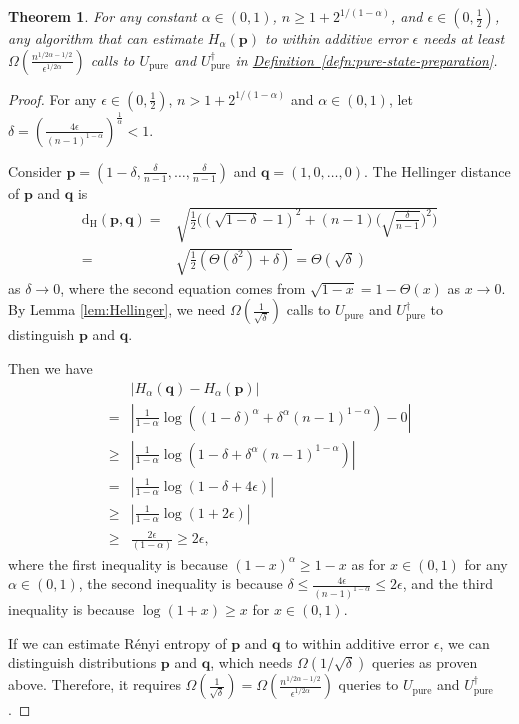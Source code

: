 \documentclass[journal]{IEEEtran}
\newtheorem{theorem}{Theorem}
\newcommand{\defn}[1]{\hyperref[defn:#1]{Definition~\ref*{defn:#1}}}
\begin{document}
\begin{theorem}\label{thm:lower}
    For any constant $\alpha\in (0,1)$, $n \ge 1+2^{1/(1-\alpha)}$, and $\epsilon\in(0,\frac{1}{2})$, any algorithm that can estimate $H_{\alpha}(\mathbf{p})$ to within additive error $\epsilon$ needs at least $\Omega\left(\frac{n^{1/2\alpha-1/2}}{\epsilon^{1/2\alpha}}\right)$ calls to $U_{\mathrm{pure}}$ and $U_{\mathrm{pure}}^{\dagger}$ in \defn{pure-state-preparation}.
\end{theorem}
\begin{proof}
For any $\epsilon\in (0,\frac{1}{2})$, $n > 1+2^{1/(1-\alpha)}$ and $\alpha \in (0,1)$, let $\delta = \left(\frac{4\epsilon}{(n-1)^{1-\alpha}}\right)^{\frac{1}{\alpha}} < 1$. 

Consider $\mathbf{p}=\left(1-\delta, \frac{\delta}{n-1}, \ldots, \frac{\delta}{n-1}\right)$ and $\mathbf{q}=(1,0, \ldots, 0)$. The Hellinger distance of $\mathbf{p}$ and $\mathbf{q}$ is 
\begin{align}
    \mathrm{d_{H}}(\mathbf{p}, \mathbf{q}) = & \sqrt{\frac{1}{2}\biggl((\sqrt{1-\delta}-1)^2+ (n-1)\biggl(\sqrt{\frac{\delta}{n-1}}\biggr)^2 \biggr)} \nonumber \\
    = & \sqrt{\frac{1}{2}\left(\Theta(\delta^2) + \delta\right)}
    = \Theta(\sqrt{\delta})
\end{align}
as $\delta \to 0$, where the second equation comes from $\sqrt{1-x} = 1-\Theta(x)$ as $x\to 0$. By Lemma \ref{lem:Hellinger}, we need $\Omega\left(\frac{1}{\sqrt{\delta}}\right)$ calls to $U_{\mathrm{pure}}$ and $U_{\mathrm{pure}}^{\dagger}$ to distinguish $\mathbf{p}$ and $\mathbf{q}$. 

Then we have
\begin{align}
    &|H_{\alpha}(\mathbf{q})-H_{\alpha}(\mathbf{p})| \nonumber \\
  = & \left|\frac{1}{1-\alpha}\log((1-\delta)^{\alpha} + \delta^{\alpha}(n-1)^{1-\alpha})-0\right| \nonumber\\
  \ge & \left|\frac{1}{1-\alpha}\log(1-\delta + \delta^{\alpha}(n-1)^{1-\alpha})\right| \nonumber\\
  = & \left| \frac{1}{1-\alpha} \log \left( 1 -\delta + 4\epsilon\right)\right|\nonumber\\
  \ge & \left| \frac{1}{1-\alpha} \log \left(1+ 2\epsilon\right)\right|\nonumber\\
  \ge & \frac{2\epsilon}{(1-\alpha)} \ge 2\epsilon,
\end{align}
where the first inequality is because $(1-x)^\alpha \ge 1-x$ as for $x\in(0,1)$ for any $\alpha\in(0,1)$, the second inequality is because $\delta \le \frac{4\epsilon}{(n-1)^{1-\alpha}}\le 2\epsilon$, and the third inequality is because $\log (1+x) \ge x$ for $x\in(0,1)$.
  

If we can estimate R{\'e}nyi entropy of $\mathbf{p}$ and $\mathbf{q}$ to within additive error $\epsilon$, we can distinguish distributions $\mathbf{p}$ and $\mathbf{q}$, which needs $\Omega(1/\sqrt{\delta})$ queries as proven above. Therefore, it requires $\Omega\left(\frac{1}{\sqrt{\delta}}\right) = \Omega\left(\frac{n^{1/2\alpha-1/2}}{\epsilon^{1/2\alpha}}\right)$ queries to $U_{\mathrm{pure}}$ and $U_{\mathrm{pure}}^{\dagger}$. 
\end{proof}
\end{document}
